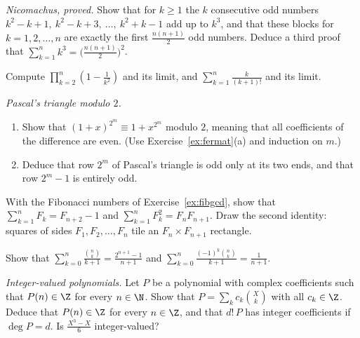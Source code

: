 \begin{exercise}[$\star$]\label{ex:odds}
\emph{Nicomachus, proved.} Show that for $k\ge1$ the $k$ consecutive odd numbers $k^2-k+1,\ k^2-k+3,\ \dots,\ k^2+k-1$ add up to $k^3$, and that these
blocks for $k=1,2,\dots,n$ are exactly the first $\frac{n(n+1)}2$ odd numbers. Deduce a third proof that $\sum_{k=1}^nk^3=\bigl(\frac{n(n+1)}2\bigr)^2$.
\end{exercise}

\begin{exercise}[$\star$]\label{ex:telprod}
Compute $\displaystyle\prod_{k=2}^n\left(1-\frac1{k^2}\right)$ and its limit, and $\displaystyle\sum_{k=1}^n\frac{k}{(k+1)!}$ and its limit.
\end{exercise}

\begin{exercise}[$\star\star$]\label{ex:pascalmod2}
\emph{Pascal's triangle modulo $2$.}
\begin{enumerate}[label=(\alph*)]
\item Show that $(1+x)^{2^m}\equiv1+x^{2^m}$ modulo $2$, meaning that all coefficients of the difference are even. (Use Exercise~\ref{ex:fermat}(a) and induction on $m$.)
\item Deduce that row $2^m$ of Pascal's triangle is odd only at its two ends, and that row $2^m-1$ is entirely odd.
\end{enumerate}
\end{exercise}

\begin{exercise}[$\star\star$]\label{ex:fibsums}
With the Fibonacci numbers of Exercise~\ref{ex:fibgcd}, show that $\sum_{k=1}^nF_k=F_{n+2}-1$ and $\sum_{k=1}^nF_k^2=F_nF_{n+1}$. Draw the second
identity: squares of sides $F_1,F_2,\dots,F_n$ tile an $F_n\times F_{n+1}$ rectangle.
\end{exercise}

\begin{exercise}[$\star\star$]\label{ex:binomfrac}
Show that $\displaystyle\sum_{k=0}^n\frac{\binom nk}{k+1}=\frac{2^{n+1}-1}{n+1}$ and $\displaystyle\sum_{k=0}^n\frac{(-1)^k\binom nk}{k+1}=\frac1{n+1}$.
\end{exercise}

\begin{exercise}[$\star\star$]\label{ex:intpoly}
\emph{Integer-valued polynomials.} Let $P$ be a polynomial with complex coefficients such that $P(n)\in\Z$ for every $n\in\N$. Show that
$P=\sum_kc_k\binom Xk$ with all $c_k\in\Z$. Deduce that $P(n)\in\Z$ for every $n\in\Z$, and that $d!\,P$ has integer coefficients if $\deg P=d$. Is
$\frac{X^3-X}6$ integer-valued?
\end{exercise}

